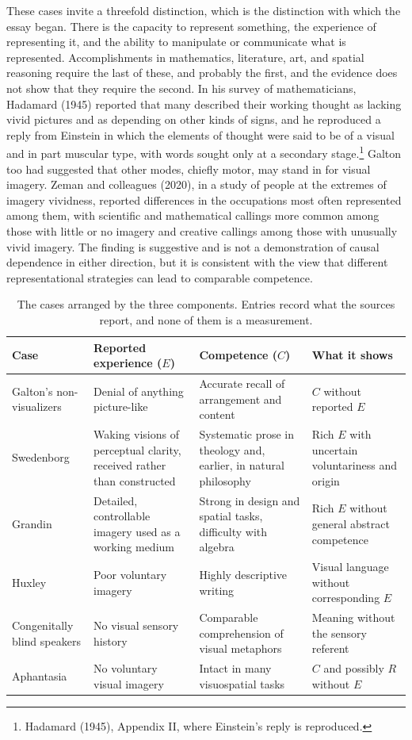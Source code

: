 \documentclass[11pt]{article}
\theoremstyle{remark}
\begin{document}
These cases invite a threefold distinction, which is the distinction with which the essay began. There is the capacity to represent something, the experience of representing it, and the ability to manipulate or communicate what is represented. Accomplishments in mathematics, literature, art, and spatial reasoning require the last of these, and probably the first, and the evidence does not show that they require the second. In his survey of mathematicians, Hadamard (1945) reported that many described their working thought as lacking vivid pictures and as depending on other kinds of signs, and he reproduced a reply from Einstein in which the elements of thought were said to be of a visual and in part muscular type, with words sought only at a secondary stage.\footnote{Hadamard (1945), Appendix II, where Einstein's reply is reproduced.} Galton too had suggested that other modes, chiefly motor, may stand in for visual imagery. Zeman and colleagues (2020), in a study of people at the extremes of imagery vividness, reported differences in the occupations most often represented among them, with scientific and mathematical callings more common among those with little or no imagery and creative callings among those with unusually vivid imagery. The finding is suggestive and is not a demonstration of causal dependence in either direction, but it is consistent with the view that different representational strategies can lead to comparable competence.

\begin{table}[ht]
\centering
\small
\begin{tabular}{p{2.6cm}p{3.7cm}p{3.7cm}p{3.2cm}}
\toprule
Case & Reported experience ($E$) & Competence ($C$) & What it shows \\
\midrule
Galton's non-visualizers & Denial of anything picture-like & Accurate recall of arrangement and content & $C$ without reported $E$ \\
Swedenborg & Waking visions of perceptual clarity, received rather than constructed & Systematic prose in theology and, earlier, in natural philosophy & Rich $E$ with uncertain voluntariness and origin \\
Grandin & Detailed, controllable imagery used as a working medium & Strong in design and spatial tasks, difficulty with algebra & Rich $E$ without general abstract competence \\
Huxley & Poor voluntary imagery & Highly descriptive writing & Visual language without corresponding $E$ \\
Congenitally blind speakers & No visual sensory history & Comparable comprehension of visual metaphors & Meaning without the sensory referent \\
Aphantasia & No voluntary visual imagery & Intact in many visuospatial tasks & $C$ and possibly $R$ without $E$ \\
\bottomrule
\end{tabular}
\caption{The cases arranged by the three components. Entries record what the sources report, and none of them is a measurement.}
\end{table}
\end{document}

